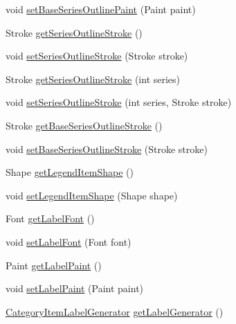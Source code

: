 \begin{DoxyCompactItemize}
void \mbox{\hyperlink{classorg_1_1jfree_1_1chart_1_1plot_1_1_spider_web_plot_a5e99c9753b6675a1a89811aa2d5328e9}{set\+Base\+Series\+Outline\+Paint}} (Paint paint)
\item 
Stroke \mbox{\hyperlink{classorg_1_1jfree_1_1chart_1_1plot_1_1_spider_web_plot_a889536d2279dd63419dc22ff0543462c}{get\+Series\+Outline\+Stroke}} ()
\item 
void \mbox{\hyperlink{classorg_1_1jfree_1_1chart_1_1plot_1_1_spider_web_plot_a205550bd8416cc8f2a0fbe5f3ef6bd42}{set\+Series\+Outline\+Stroke}} (Stroke stroke)
\item 
Stroke \mbox{\hyperlink{classorg_1_1jfree_1_1chart_1_1plot_1_1_spider_web_plot_a23317b17c4f1e8931dbf1308594afbcc}{get\+Series\+Outline\+Stroke}} (int series)
\item 
void \mbox{\hyperlink{classorg_1_1jfree_1_1chart_1_1plot_1_1_spider_web_plot_a8ff39f99b306dda63deeeee29b6cd6b3}{set\+Series\+Outline\+Stroke}} (int series, Stroke stroke)
\item 
Stroke \mbox{\hyperlink{classorg_1_1jfree_1_1chart_1_1plot_1_1_spider_web_plot_a8033dcbea4dad86e0453fbbc824702ad}{get\+Base\+Series\+Outline\+Stroke}} ()
\item 
void \mbox{\hyperlink{classorg_1_1jfree_1_1chart_1_1plot_1_1_spider_web_plot_a0428b9d8a0d14851be3cc7bf729687b7}{set\+Base\+Series\+Outline\+Stroke}} (Stroke stroke)
\item 
Shape \mbox{\hyperlink{classorg_1_1jfree_1_1chart_1_1plot_1_1_spider_web_plot_af1384896a267b06d1f0265ee0a34f484}{get\+Legend\+Item\+Shape}} ()
\item 
void \mbox{\hyperlink{classorg_1_1jfree_1_1chart_1_1plot_1_1_spider_web_plot_a0e62740eed3460f77015809f41fdfaea}{set\+Legend\+Item\+Shape}} (Shape shape)
\item 
Font \mbox{\hyperlink{classorg_1_1jfree_1_1chart_1_1plot_1_1_spider_web_plot_a5993272d93bc89f903ef3f4a0fbc8bc7}{get\+Label\+Font}} ()
\item 
void \mbox{\hyperlink{classorg_1_1jfree_1_1chart_1_1plot_1_1_spider_web_plot_aba780c8190d9f3467f5ade6e0735fe50}{set\+Label\+Font}} (Font font)
\item 
Paint \mbox{\hyperlink{classorg_1_1jfree_1_1chart_1_1plot_1_1_spider_web_plot_a89122725e5bb2963445c64d779f386c7}{get\+Label\+Paint}} ()
\item 
void \mbox{\hyperlink{classorg_1_1jfree_1_1chart_1_1plot_1_1_spider_web_plot_a360a2dd69ff25f10ec2f33cdc9602a0a}{set\+Label\+Paint}} (Paint paint)
\item 
\mbox{\hyperlink{interfaceorg_1_1jfree_1_1chart_1_1labels_1_1_category_item_label_generator}{Category\+Item\+Label\+Generator}} \mbox{\hyperlink{classorg_1_1jfree_1_1chart_1_1plot_1_1_spider_web_plot_a489c44a3be5faba2861730381c3b769e}{get\+Label\+Generator}} ()

\end{DoxyCompactItemize}

